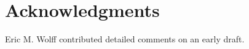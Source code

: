 \documentclass{amsart}
\theoremstyle{plain}
\theoremstyle{definition}
\theoremstyle{definition}
\begin{document}



\section*{Acknowledgments}

Eric M. Wolff contributed detailed comments on an early draft.




\end{document}
